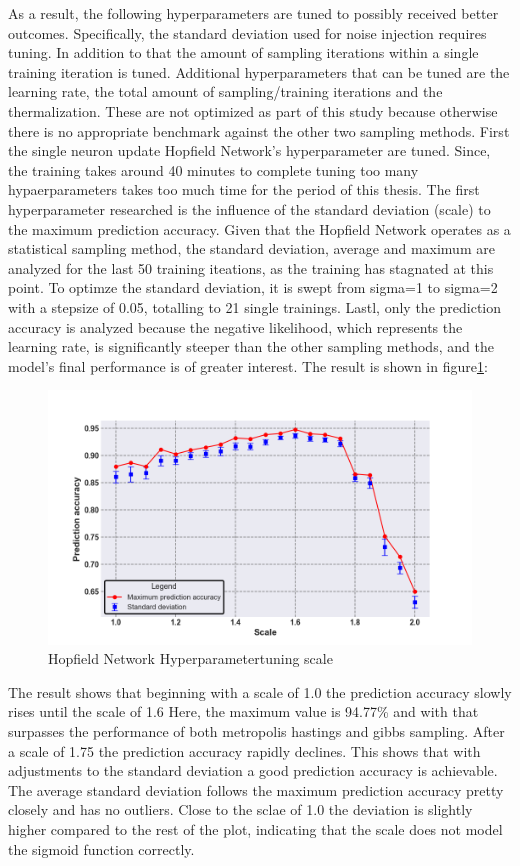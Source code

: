 As a result, the following hyperparameters are tuned to possibly received better outcomes. 
Specifically, the standard deviation used for noise injection requires tuning.
In addition to that the amount of sampling iterations within a single training iteration is tuned.
Additional hyperparameters that can be tuned are the learning rate, the total amount of sampling/training iterations and the thermalization.
These are not optimized as part of this study because otherwise there is no appropriate benchmark against the other two 
sampling methods. 
First the single neuron update Hopfield Network's hyperparameter are tuned. 
Since, the training takes around 40 minutes to complete tuning too many hypaerparameters takes too much time for the period of this thesis. 
The first hyperparameter researched is the influence of the standard deviation (scale) to the maximum prediction accuracy. 
Given that the Hopfield Network operates as a statistical sampling method, the standard deviation, average and maximum are analyzed for the last 50 training iteations, as the training has stagnated at this point.
To optimze the standard deviation, it is swept from sigma=1 to sigma=2 with a stepsize of 0.05, totalling to 21 single trainings.
Lastl, only the prediction accuracy is analyzed because the negative likelihood, which represents the learning rate, is significantly steeper than the other sampling methods, and the model's final performance is of greater interest.
The result is shown in figure\ref{Hyperparamers_Scale_ohne}:
\begin{figure}[H]
    \centering
    \includegraphics[width=0.9\linewidth]{graphics/NEW_Scale_Ohne_N2_Half_Pred_Acc.png}
    \caption{Hopfield Network Hyperparametertuning scale}
    \label{Hyperparamers_Scale_ohne}
\end{figure}
The result shows that beginning with a scale of 1.0 the prediction accuracy slowly rises until the scale of 1.6
Here, the maximum value is 94.77\% and with that surpasses the performance of both metropolis hastings and gibbs sampling. 
After a scale of 1.75 the prediction accuracy rapidly declines.
This shows that with adjustments to the standard deviation a good prediction accuracy is achievable. 
The average standard deviation follows the maximum prediction accuracy pretty closely and has no outliers.
Close to the sclae of 1.0 the deviation is slightly higher compared to the rest of the plot, indicating that the scale does not model the sigmoid function correctly. 

